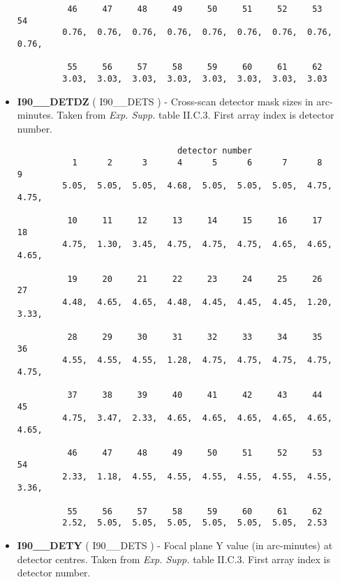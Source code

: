 \begin{itemize}
\begin{minipage}[t]{\textwidth}
\begin{verbatim}
          46     47     48     49     50     51     52     53     54
         0.76,  0.76,  0.76,  0.76,  0.76,  0.76,  0.76,  0.76,  0.76,

          55     56     57     58     59     60     61     62
         3.03,  3.03,  3.03,  3.03,  3.03,  3.03,  3.03,  3.03

\end{verbatim}
\normalsize
\end{minipage}

\item {\bf I90\_\_DETDZ} ( I90\_\_DETS ) -   Cross-scan detector mask sizes in arc-minutes.
Taken from {\em Exp. Supp.}  table II.C.3. First array index is detector number.

\begin{minipage}[t]{\textwidth}
\small
\begin{verbatim}
                                detector number
           1      2      3      4      5      6      7      8      9
         5.05,  5.05,  5.05,  4.68,  5.05,  5.05,  5.05,  4.75,  4.75,  

          10     11     12     13     14     15     16     17     18
         4.75,  1.30,  3.45,  4.75,  4.75,  4.75,  4.65,  4.65,  4.65,  

          19     20     21     22     23     24     25     26     27
         4.48,  4.65,  4.65,  4.48,  4.45,  4.45,  4.45,  1.20,  3.33,  

          28     29     30     31     32     33     34     35     36
         4.55,  4.55,  4.55,  1.28,  4.75,  4.75,  4.75,  4.75,  4.75,  

          37     38     39     40     41     42     43     44     45
         4.75,  3.47,  2.33,  4.65,  4.65,  4.65,  4.65,  4.65,  4.65,  

          46     47     48     49     50     51     52     53     54
         2.33,  1.18,  4.55,  4.55,  4.55,  4.55,  4.55,  4.55,  3.36,

          55     56     57     58     59     60     61     62
         2.52,  5.05,  5.05,  5.05,  5.05,  5.05,  5.05,  2.53

\end{verbatim}
\normalsize
\end{minipage}

\item {\bf I90\_\_DETY} ( I90\_\_DETS ) -    Focal plane Y value (in arc-minutes) at 
detector centres. Taken from {\em Exp. Supp.} table II.C.3. First array index is detector number.


\end{itemize}
